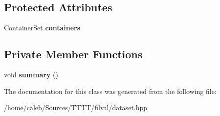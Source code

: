 \subsection*{Protected Attributes}
\begin{DoxyCompactItemize}
\item 
\hypertarget{classfilval_1_1DataSet_a8864e835264b7fc07c02b629c8491810}{}\label{classfilval_1_1DataSet_a8864e835264b7fc07c02b629c8491810} 
Container\+Set {\bfseries containers}
\end{DoxyCompactItemize}
\subsection*{Private Member Functions}
\begin{DoxyCompactItemize}
\item 
\hypertarget{classfilval_1_1DataSet_aecc8a880ad863c0cf63f543df384eee1}{}\label{classfilval_1_1DataSet_aecc8a880ad863c0cf63f543df384eee1} 
void {\bfseries summary} ()
\end{DoxyCompactItemize}


The documentation for this class was generated from the following file\+:\begin{DoxyCompactItemize}
\item 
/home/caleb/\+Sources/\+T\+T\+T\+T/filval/dataset.\+hpp\end{DoxyCompactItemize}
